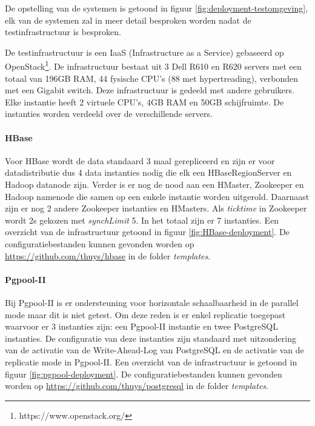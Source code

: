 De opstelling van de systemen is getoond in figuur \ref{fig:deployment-testomgeving}, elk van de systemen zal in meer detail besproken worden nadat de testinfrastructuur is besproken.  

De testinfrastructuur is een IaaS (Infrastructure as a Service) gebaseerd op OpenStack\footnote{https://www.openstack.org/}. De infrastructuur bestaat uit 3 Dell R610 en R620 servers met een totaal van 196GB RAM, 44 fysische CPU's (88 met hypertreading), verbonden met een Gigabit switch. Deze infrastructuur is gedeeld met andere gebruikers. Elke instantie heeft 2 virtuele CPU's, 4GB RAM en 50GB schijfruimte. De instanties worden verdeeld over de verschillende servers. 

\paragraph{HBase} Voor HBase wordt de data standaard 3 maal gerepliceerd en zijn er voor datadistributie dus 4 data instanties nodig die elk een HBaseRegionServer en Hadoop datanode zijn. Verder is er nog de nood aan een HMaster, Zookeeper en Hadoop namenode die samen op een enkele instantie worden uitgerold. Daarnaast zijn er nog 2 andere Zookeeper instanties en HMasters. Als \textit{ticktime} in Zookeeper wordt 2s gekozen met \textit{synchLimit} 5. In het totaal zijn er 7 instanties. Een overzicht van de infrastructuur getoond in figuur \ref{fig:HBase-deployment}. De configuratiebestanden kunnen gevonden worden op \url{https://github.com/thuys/hbase} in de folder \textit{templates}.  

\paragraph{Pgpool-II} Bij Pgpool-II is er ondersteuning voor horizontale schaalbaarheid in de parallel mode maar dit is niet getest. Om deze reden is er enkel replicatie toegepast waarvoor er 3 instanties zijn: een Pgpool-II instantie en twee PostgreSQL instanties. De configuratie van deze instanties zijn standaard met uitzondering van de activatie van de Write-Ahead-Log van PostgreSQL en de activatie van de replicatie mode in Pgpool-II. Een overzicht van de infrastructuur is getoond in figuur \ref{fig:pgpool-deployment}. De configuratiebestanden kunnen gevonden worden op \url{https://github.com/thuys/postgresql} in de folder \textit{templates}.

